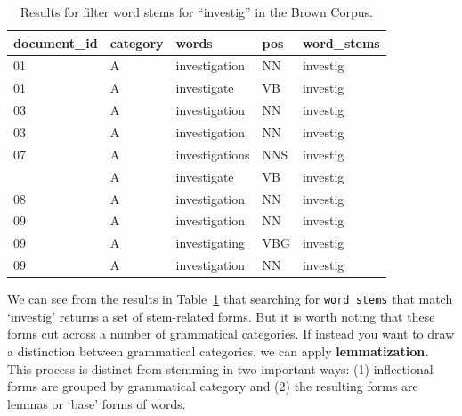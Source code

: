 \documentclass[
  letterpaper,
]{latex/krantz}
\begin{document}
\hypertarget{tbl-recoding-stemming-brown-search}{}
\begin{table}
\caption{\label{tbl-recoding-stemming-brown-search}Results for filter word stems for ``investig'' in the Brown Corpus. }\tabularnewline

\centering
\begin{tabular}{lllll}
\toprule
document\_id & category & words & pos & word\_stems\\
\midrule
01 & A & investigation & NN & investig\\
01 & A & investigate & VB & investig\\
03 & A & investigation & NN & investig\\
03 & A & investigation & NN & investig\\
07 & A & investigations & NNS & investig\\
\addlinespace
07 & A & investigate & VB & investig\\
08 & A & investigation & NN & investig\\
09 & A & investigation & NN & investig\\
09 & A & investigating & VBG & investig\\
09 & A & investigation & NN & investig\\
\bottomrule
\end{tabular}
\end{table}

We can see from the results in
Table~\ref{tbl-recoding-stemming-brown-search} that searching for
\texttt{word\_stems} that match `investig' returns a set of stem-related
forms. But it is worth noting that these forms cut across a number of
grammatical categories. If instead you want to draw a distinction
between grammatical categories, we can apply \textbf{lemmatization.}
This process is distinct from stemming in two important ways: (1)
inflectional forms are grouped by grammatical category and (2) the
resulting forms are lemmas or `base' forms of words.
\end{document}
